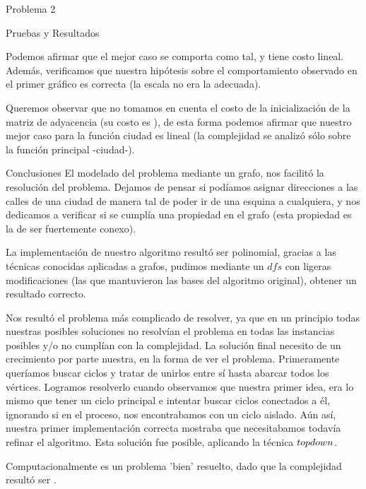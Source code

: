 \begin{section}{Problema 2}
\begin{subsection}{Pruebas y Resultados}

		Podemos afirmar que el mejor caso se comporta como tal, y tiene costo lineal. Además, verificamos que nuestra hipótesis sobre el comportamiento observado en el primer gráfico es correcta (la escala no era la adecuada).

		Queremos observar que no tomamos en cuenta el costo de la inicialización de la matriz de adyacencia (su costo es ), de esta forma podemos afirmar que nuestro mejor caso para la función ciudad es lineal (la complejidad se analizó sólo sobre la función principal -ciudad-).

	\end{subsection}

	\begin{subsection}{Conclusiones}
		El modelado del problema mediante un grafo, nos facilitó la resolución del problema. Dejamos de pensar si podíamos asignar direcciones a las calles de una ciudad de manera tal de poder ir de una esquina a cualquiera, y nos dedicamos a verificar si se cumplía una propiedad en el grafo (esta propiedad es la de ser fuertemente conexo).

		La implementación de nuestro algoritmo resultó ser polinomial, gracias a las técnicas conocidas aplicadas a grafos, pudimos mediante un $dfs$ con ligeras modificaciones (las que mantuvieron las bases del algoritmo original), obtener un resultado correcto. 

		Nos resultó el problema más complicado de resolver, ya que en un principio todas nuestras posibles soluciones no resolvían el problema en todas las instancias posibles y/o no cumplían con la complejidad. La solución final necesito de un crecimiento por parte nuestra, en la forma de ver el problema. Primeramente queríamos buscar ciclos y tratar de unirlos entre sí hasta abarcar todos los vértices. Logramos resolverlo cuando observamos que nuestra primer idea, era lo mismo que tener un ciclo principal e intentar buscar ciclos conectados a él, ignorando si en el proceso, nos encontrabamos con un ciclo aislado. Aún así, nuestra primer implementación correcta mostraba que necesitabamos todavía refinar el algoritmo. Esta solución fue posible, aplicando la técnica $top\-down$.

		Computacionalmente es un problema 'bien' resuelto, dado que la complejidad resultó ser .

	\end{subsection}
\end{section}

